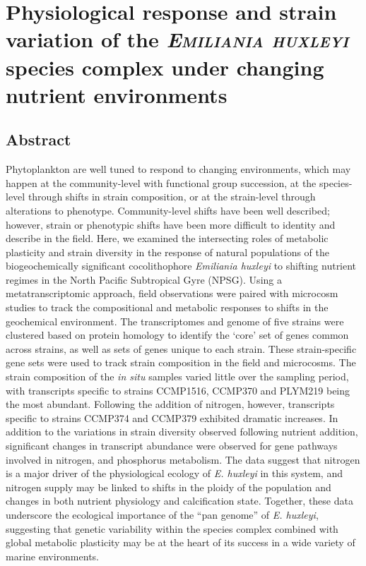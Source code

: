 

\chapter{Physiological response and strain variation of the \textsl\textsc{Emiliania huxleyi} species complex under changing nutrient environments}

\raggedbottom


\clearpage

\section{Abstract} 
Phytoplankton are well tuned to respond to changing environments, which may happen at the community-level with functional group succession, at the species-level through shifts in strain composition, or at the strain-level through alterations to phenotype. Community-level shifts have been well described; however, strain or phenotypic shifts have been more difficult to identity and describe in the field. Here, we examined the intersecting roles of metabolic plasticity and strain diversity in the response of natural populations of the biogeochemically significant cocolithophore \textit{Emiliania huxleyi} to shifting nutrient regimes in the North Pacific Subtropical Gyre (NPSG). Using a metatranscriptomic approach, field observations were paired with microcosm studies to track the compositional and metabolic responses to shifts in the geochemical environment. The transcriptomes and genome of five strains were clustered based on protein homology to identify the `core' set of genes common across strains, as well as sets of genes unique to each strain. These strain-specific gene sets were used to track strain composition in the field and microcosms. The strain composition of the \textit{in situ} samples varied little over the sampling period, with transcripts specific to strains CCMP1516, CCMP370 and PLYM219 being the most abundant.  Following the addition of nitrogen, however, transcripts specific to strains CCMP374 and CCMP379 exhibited dramatic increases. In addition to the variations in strain diversity observed following nutrient addition, significant changes in transcript abundance were observed for gene pathways involved in nitrogen, and phosphorus metabolism.  The data suggest that nitrogen is a major driver of the physiological ecology of \textit{E. huxleyi} in this system, and nitrogen supply may be linked to shifts in the ploidy of the population and changes in both nutrient physiology and calcification state. Together, these data underscore the ecological importance of the ``pan genome'' of \textit{E. huxleyi}, suggesting that genetic variability within the species complex combined with global metabolic plasticity may be at the heart of its success in a wide variety of marine environments. \par

